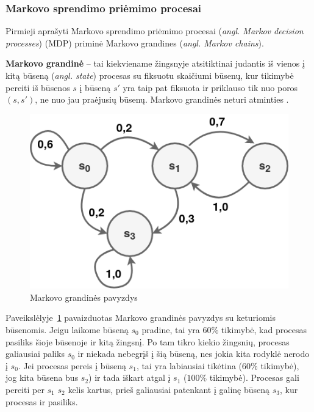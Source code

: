 \documentclass{VUMIFPSbakalaurinis}
\begin{document}
\subsubsection{Markovo sprendimo priėmimo procesai}\label{subsubsec:MDP}
{ 
	Pirmieji aprašyti Markovo sprendimo priėmimo procesai (\textit{angl. Markov decision processes}) (MDP) \cite{mdp} priminė Markovo grandines (\textit{angl. Markov chains}).\par
	
	\textbf{Markovo grandinė} -- tai kiekviename žingsnyje atsitiktinai judantis iš vienos į kitą būseną (\textit{angl. state}) procesas su fiksuotu skaičiumi būsenų, kur tikimybė pereiti iš būsenos \(s\) į būseną \(s'\) yra taip pat fiksuota ir priklauso tik nuo poros \((s, s')\), ne nuo jau praėjusių būsenų. Markovo grandinės neturi atminties \cite{handson}. 
	
	\begin{figure}[H]
		\centering
		\includegraphics[scale=0.33]{img/markov_chain}
		\caption{Markovo grandinės pavyzdys}
		\label{img:markovChain}
	\end{figure} 
	
	Paveikslėlyje~\ref{img:markovChain} pavaizduotas Markovo grandinės pavyzdys su keturiomis būsenomis. Jeigu laikome būseną \(s_0\) pradine, tai yra \(60\%\) tikimybė, kad procesas pasiliks šioje būsenoje ir kitą žingsnį. Po tam tikro kiekio žingsnių, procesas galiausiai paliks \(s_0\) ir niekada nebegrįš į šią būseną, nes jokia kita rodyklė nerodo į \(s_0\). Jei procesas pereis į būseną \(s_1\), tai yra labiausiai tikėtina (\(60\%\) tikimybė), jog kita būsena bus \(s_2\)) ir tada iškart atgal į \(s_1\) (\(100\%\) tikimybė). Procesas gali pereiti per \(s_1\) \(s_2\) kelis kartus, prieš galiausiai patenkant į galinę būseną \(s_3\), kur procesas ir pasiliks.\par
	
}
\end{document}
